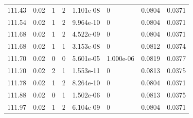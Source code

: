 \documentclass[preview]{standalone}
\begin{document}
{{{{{{{{{{{{{{{{{\begin{tabular}{L{1.2cm}C{1.2cm} C{0.3cm}C{0.5cm} C{1.4cm}C{1.4cm} C{1.4cm}C{1.4cm}}
  111.43  &  0.02  & 1     &  2 &  1.101e-08  & 0  & 0.0804 &  0.0371   \\ 
  111.54  &  0.02  & 1     &  2 &  9.964e-10  & 0  & 0.0804 &  0.0371   \\ 
  111.68  &  0.02  & 1     &  2 &  4.522e-09  & 0  & 0.0804 &  0.0371   \\ 
  111.68  &  0.02  & 1     &  1 &  3.153e-08  & 0  & 0.0812 &  0.0374   \\ 
  111.70  &  0.02  & 0     &  0 &  5.601e-05  & 1.000e-06  & 0.0819 &  0.0377   \\ 
  111.70  &  0.02  & 2     &  1 &  1.553e-11  & 0  & 0.0813 &  0.0375   \\ 
  111.78  &  0.02  & 1     &  2 &  8.264e-10  & 0  & 0.0804 &  0.0371   \\ 
  111.88  &  0.02  & 0     &  1 &  1.502e-06  & 0  & 0.0813 &  0.0375   \\ 
  111.97  &  0.02  & 1     &  2 &  6.104e-09  & 0  & 0.0804 &  0.0371   \\ 
\hline 
\end{tabular} 

}}}}}}}}}}}}}}}}}
\end{document}
